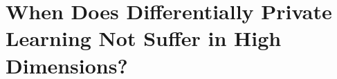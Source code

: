 \chapter[When Does Differentially Private Learning Not Suffer in \\High Dimensions?]{\LARGE When Does Differentially Private Learning Not Suffer in High Dimensions?}\label{ch_5}

